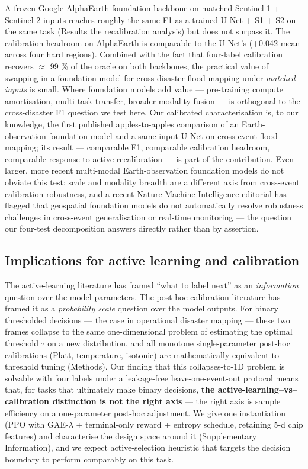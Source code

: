 \documentclass[sn-nature,lineno]{sn-jnl}
\theoremstyle{thmstyleone}
\theoremstyle{thmstyletwo}
\theoremstyle{thmstylethree}
\begin{document}
A frozen Google AlphaEarth foundation backbone on matched Sentinel-1 +
Sentinel-2 inputs reaches roughly the same F1 as a trained U-Net + S1 +
S2 on the same task (Results the recalibration analysis) but does not surpass it. The
calibration headroom on AlphaEarth is comparable to the U-Net's
(+0.042 mean across four hard regions). Combined with the fact that
four-label calibration recovers $\approx$ 99 \% of the oracle on both backbones,
the practical value of
swapping in a foundation model for cross-disaster flood mapping under
\emph{matched inputs} is small. Where foundation models add
value --- pre-training compute amortisation, multi-task transfer, broader
modality fusion --- is orthogonal to the cross-disaster F1 question we
test here. Our calibrated characterisation is, to our knowledge, the
first published apples-to-apples comparison of an Earth-observation
foundation model and a same-input U-Net on cross-event flood mapping;
its result --- comparable F1, comparable calibration headroom,
comparable response to active recalibration --- is part of the
contribution. Even larger, more recent multi-modal Earth-observation
foundation models \cite{wu2025skysense} do not obviate this test: scale and modality
breadth are a different axis from cross-event calibration robustness, and
a recent Nature Machine Intelligence editorial has flagged that
geospatial foundation models do not automatically resolve robustness
challenges in cross-event generalisation or real-time monitoring
\cite{nmi2025editorial} --- the
question our four-test decomposition answers directly rather than by
assertion.

\subsection{Implications for active learning and calibration}\label{implications-for-active-learning-and-calibration}

The active-learning literature has framed ``what to label next'' as an
\emph{information} question over the model parameters. The post-hoc
calibration literature has framed it as a \emph{probability scale} question
over the model outputs. For binary thresholded decisions --- the case in
operational disaster mapping --- these two frames collapse to the same
one-dimensional problem of estimating the optimal threshold $\tau$ on a new
distribution, and all monotone single-parameter post-hoc calibrations
(Platt, temperature, isotonic) are mathematically equivalent to
threshold tuning (Methods). Our finding that this collapses-to-1D
problem is solvable with four labels under a leakage-free
leave-one-event-out protocol means that, for tasks that ultimately make
binary decisions, \textbf{the active-learning--vs--calibration distinction is
not the right axis} --- the right axis is sample efficiency on a
one-parameter post-hoc adjustment. We give one instantiation
(PPO with GAE-$\lambda$ + terminal-only reward + entropy schedule, retaining
5-d chip features) and characterise the design space around it
(Supplementary Information), and we expect active-selection
heuristic that targets the decision boundary to perform comparably on
this task.
\end{document}
